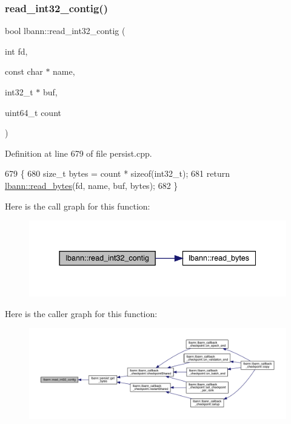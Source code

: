 \subsubsection{\texorpdfstring{read\+\_\+int32\+\_\+contig()}{read\_int32\_contig()}}
{\footnotesize\ttfamily bool lbann\+::read\+\_\+int32\+\_\+contig (\begin{DoxyParamCaption}\item[{int}]{fd,  }\item[{const char $\ast$}]{name,  }\item[{int32\+\_\+t $\ast$}]{buf,  }\item[{uint64\+\_\+t}]{count }\end{DoxyParamCaption})}



Definition at line 679 of file persist.\+cpp.


\begin{DoxyCode}
679                                                                                     \{
680   \textcolor{keywordtype}{size\_t} bytes = count * \textcolor{keyword}{sizeof}(int32\_t);
681   \textcolor{keywordflow}{return} \hyperlink{namespacelbann_a85385e2a9e058b6720300b4cbdd2b1d0}{lbann::read\_bytes}(fd, name, buf, bytes);
682 \}
\end{DoxyCode}
Here is the call graph for this function\+:\nopagebreak
\begin{figure}[H]
\begin{center}
\leavevmode
\includegraphics[width=337pt]{namespacelbann_acb5b0f1b30c9ab2fba700bb953515810_cgraph}
\end{center}
\end{figure}
Here is the caller graph for this function\+:\nopagebreak
\begin{figure}[H]
\begin{center}
\leavevmode
\includegraphics[width=350pt]{namespacelbann_acb5b0f1b30c9ab2fba700bb953515810_icgraph}
\end{center}
\end{figure}
\mbox{\label{namespacelbann_abebab8298e56db6a455a9ed08ab42bb4}} 
